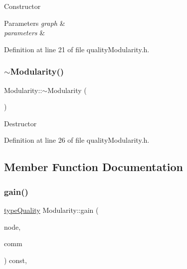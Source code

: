 Constructor 
\begin{DoxyParams}{Parameters}
{\em graph} & \\
\hline
{\em parameters} & \\
\hline
\end{DoxyParams}


Definition at line 21 of file quality\+Modularity.\+h.

\mbox{\label{classModularity_a5f23716ff9c3d806e3a295c308dba5a9}} 
\subsubsection{\texorpdfstring{$\sim$\+Modularity()}{~Modularity()}}
{\footnotesize\ttfamily Modularity\+::$\sim$\+Modularity (\begin{DoxyParamCaption}{ }\end{DoxyParamCaption})\hspace{0.3cm}{\ttfamily [inline]}}

Destructor 

Definition at line 26 of file quality\+Modularity.\+h.



\subsection{Member Function Documentation}
\mbox{\label{classModularity_afb4e750456a0138c2880e679df6d431d}} 
\subsubsection{\texorpdfstring{gain()}{gain()}}
{\footnotesize\ttfamily \hyperlink{qualityInterface_8h_a15a3ec6041e6e02d00d2eff22c20fd94}{type\+Quality} Modularity\+::gain (\begin{DoxyParamCaption}\item[{const \hyperlink{edge_8h_a5fbd20c46956d479cb10afc9855223f6}{type\+Vertex} \&}]{node,  }\item[{const \hyperlink{graphUndirectedGroupable_8h_a914da95c9ea7f14f4b7f875c36818556}{type\+Community} \&}]{comm }\end{DoxyParamCaption}) const\hspace{0.3cm}{\ttfamily [inline]}, {\ttfamily [virtual]}}

